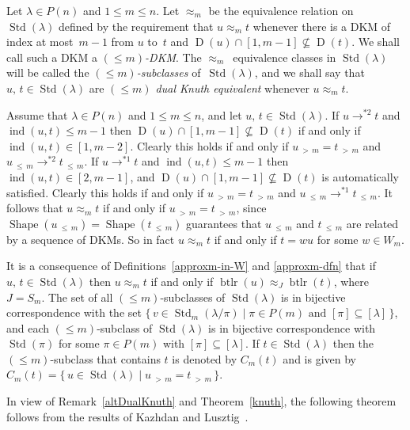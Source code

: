 \documentclass[ALCO,ThmDefs,Unicode,epreuves]{cedram}
\DeclareMathOperator{\word}{btlr}
\newcommand{\morethan}[2]{#1\,{_{>\,#2}}}
\newcommand{\Lessthan}[2]{#1\,{_{\leqslant\,#2}}}
\DeclareMathOperator{\STD}{Std}
\DeclareMathOperator{\shape}{Shape}
\DeclareMathOperator{\ind}{ind}
\DeclareMathOperator{\D}{D}
\begin{document}
\begin{defi}\label{approxm-dfn}
Let $\lambda\in P(n)$ and $1\leqslant m\leqslant n$. Let $\approx_m$
be the equivalence relation on $\STD(\lambda)$ defined by the
requirement that $u\approx_m t$ whenever there is a DKM
of index at most~$m-1$ from $u$ to~$t$ and
$\D(u)\cap[1,m-1]\nsubseteq\D(t)$. We shall call such a DKM a
\emph{$(\leqslant m)$-DKM}.
The $\approx_m$~equivalence classes in $\STD(\lambda)$ will be called the
\emph{$(\leqslant m)$-subclasses}
of~$\STD(\lambda)$, and we shall say that $u,\,t\in\STD(\lambda)$ are
\emph{$(\leqslant m)$ dual Knuth equivalent} whenever $u\approx_m t$.
\end{defi}

\begin{rema}\label{approxm-rmk}
Assume that $\lambda\in P(n)$ and $1\leqslant m\leqslant n$, and
let $u,\,t\in\STD(\lambda)$. If $u\to^{*2}t$ and $\ind(u,t)\leqslant m-1$
then $\D(u)\cap[1,m-1]\nsubseteq\D(t)$ if and only if $\ind(u,t)\in[1,m-2]$.
Clearly this holds if and only if $\morethan um=\morethan tm$ and
$\Lessthan um\to^{*2}\Lessthan tm$. If $u\to^{*1}t$ and $\ind(u,t)\leqslant m-1$
then $\ind(u,t)\in[2,m-1]$, and $\D(u)\cap[1,m-1]\nsubseteq\D(t)$ is
automatically satisfied. Clearly this holds if and only if
$\morethan um=\morethan tm$ and $\Lessthan um\to^{*1}\Lessthan tm$.
It follows that $u\approx_m t$ if and only if $\morethan um=\morethan tm$,
since $\shape(\Lessthan um)=\shape(\Lessthan tm)$ guarantees that
$\Lessthan um$ and $\Lessthan tm$ are related by a sequence of
DKMs. So in fact $u\approx_m t$ if and only if $t=wu$
for some $w\in W_m$.
\end{rema}
It is a consequence of Definitions~\ref{approxm-in-W} and \ref{approxm-dfn}
that if $u,\,t\in\STD(\lambda)$ then $u\approx_m t$ if and only if
$\word(u)\approx_J \word(t)$, where $J=S_m$. The set of all
$(\leqslant m)$-subclasses of $\STD(\lambda)$ is in bijective correspondence
with the set $\{\,v\in\STD_m(\lambda/\pi)\mid \pi\in P(m) \text{ and }
[\pi]\subseteq[\lambda]\,\}$, and each $(\leqslant m)$-subclass of
$\STD(\lambda)$ is in bijective correspondence with
$\STD(\pi)$ for some $\pi\in P(m)$ with $[\pi]\subseteq[\lambda]$.
If $t\in\STD(\lambda)$ then the $(\leqslant m)$-subclass that contains
$t$ is denoted by $C_m(t)$ and is given by
$C_m(t) = \{\,u\in\STD(\lambda) \mid\morethan um = \morethan tm\,\}$.

In view of Remark~\ref{altDualKnuth} and Theorem~\ref{knuth}, the following
theorem follows from the results of Kazhdan and
Lusztig~\cite[\S5]{kazlus:coxhecke}.
\end{document}
